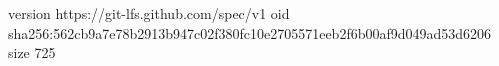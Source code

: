 version https://git-lfs.github.com/spec/v1
oid sha256:562cb9a7e78b2913b947c02f380fc10e2705571eeb2f6b00af9d049ad53d6206
size 725
